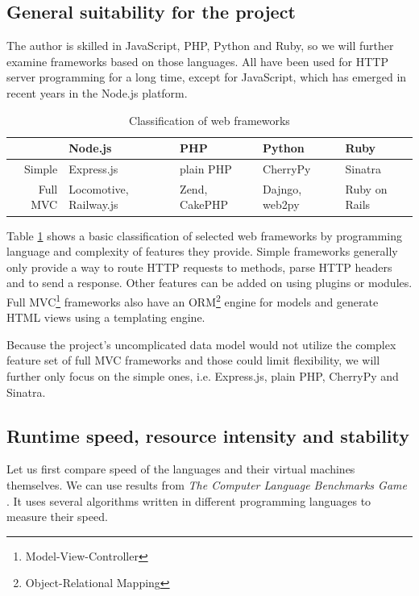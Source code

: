 \documentclass[12pt,oneside]{fithesis}
\begin{document}
	\subsection{General suitability for the project}
		The author is skilled in JavaScript, PHP, Python and Ruby, so we will further examine frameworks based on those languages. All have been used for HTTP server programming for a long time, except for JavaScript, which has emerged in recent years in the Node.js platform.\\
		\begin{table}[htb]
		\begin{tabular}{|r||p{2.2cm}|p{2.2cm}|p{2.1cm}|p{2.2cm}|}
			\hline 
			\rule[-1ex]{0pt}{2.5ex} & Node.js & PHP & Python & Ruby \\ 
			\hline\hline
			\rule[-1ex]{0pt}{2.5ex} Simple & Express.js & plain PHP & CherryPy & Sinatra \\ 
			\hline 
			\rule[-1ex]{0pt}{2.5ex} Full MVC & Locomotive, Railway.js & Zend, CakePHP & Dajngo, web2py & Ruby on Rails \\ 
			\hline 
		\end{tabular}
		\caption{Classification of web frameworks}
		\label{table:wf}
		\end{table}
	
		Table \ref{table:wf} shows a basic classification of selected web frameworks by programming language and complexity of features they provide. Simple frameworks generally only provide a way to route HTTP requests to methods, parse HTTP headers and to send a response. Other features can be added on using plugins or modules. Full MVC\footnote{Model-View-Controller} frameworks also have an ORM\footnote{Object-Relational Mapping} engine for models and generate HTML views using a templating engine.
		
		Because the project's uncomplicated data model would not utilize the complex feature set of full MVC frameworks and those could limit flexibility, we will further only focus on the simple ones, i.e. Express.js, plain PHP, CherryPy and Sinatra.
		
	\subsection{Runtime speed, resource intensity and stability}
		Let us first compare speed of the languages and their virtual machines themselves. We can use results from \emph{The Computer Language Benchmarks Game} \cite{website:bench}. It uses several algorithms written in different programming languages to measure their speed.
		
\end{document}
